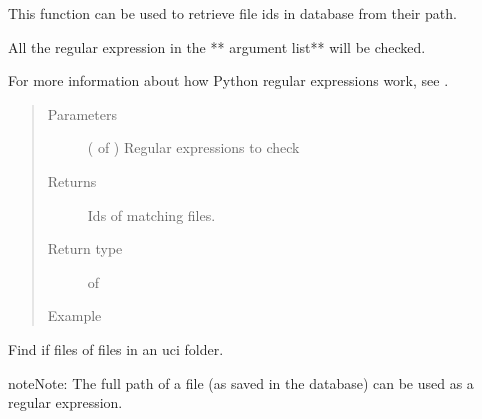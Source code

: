 \documentclass[letterpaper,10pt,english]{sphinxmanual}
\begin{document}
\begin{fulllineitems}
\label{\detokenize{load:loacore.load.file_load.get_id_files_by_file_paths}}
This function can be used to retrieve file ids in database from their path.

All the regular expression in the ** argument list** will be checked.

For more information about how Python regular expressions work, see  .
\begin{quote}\begin{description}
\item[{Parameters}] \leavevmode
{} ( of ) \textendash{} Regular expressions to check

\item[{Returns}] \leavevmode
Ids of matching files.

\item[{Return type}] \leavevmode
{} of 

\item[{Example}] \leavevmode
\end{description}\end{quote}

Find if files of files in an uci folder.

%
\begin{sphinxVerbatim}[commandchars=\\\{\}]
   
  \PYG{p}{[}\PYG{p}{]}
\end{sphinxVerbatim}

\begin{sphinxadmonition}{note}{Note:}
The full path of a file (as saved in the database) can be used as a regular expression.
\end{sphinxadmonition}

\end{fulllineitems}
\end{document}
